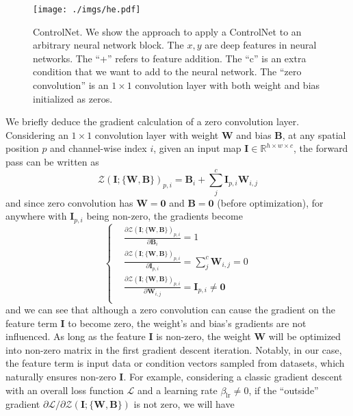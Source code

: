 \documentclass{article}
\begin{document}
\begin{figure}
	\centering
	\texttt{[image: ./imgs/he.pdf]}
	\caption{ControlNet. We show the approach to apply a ControlNet to an arbitrary neural network block. The $x, y$ are deep features in neural networks. The ``+'' refers to feature addition. The ``c'' is an extra condition that we want to add to the neural network. The ``zero convolution'' is an $1\times 1$ convolution layer with both weight and bias initialized as zeros.}
	\label{fig:he}
\end{figure}

We briefly deduce the gradient calculation of a zero convolution layer. Considering an $1\times 1$ convolution layer with weight $\bm{W}$ and bias $\bm{B}$, at any spatial position $p$ and channel-wise index $i$, given an input map $\bm{I}\in\mathbb{R}^{h\times w \times c}$, the forward pass can be written as 
\begin{equation}
	\mathcal{Z}(\bm{I};\{\bm{W},\bm{B}\})_{p,i}=\bm{B}_i + \sum_{j}^c \bm{I}_{p,i} \bm{W}_{i,j}
\end{equation}
and since zero convolution has $\bm{W}=\bm{0}$ and $\bm{B}=\bm{0}$ (before optimization), for anywhere with $\bm{I}_{p,i}$ being non-zero, the gradients become
\begin{equation}
	\left\{
	\begin{aligned}
		&\frac{\partial\mathcal{Z}(\bm{I};\{\bm{W},\bm{B}\})_{p,i}}{\partial\bm{B}_{i}} = 1 \\
		&\frac{\partial\mathcal{Z}(\bm{I};\{\bm{W},\bm{B}\})_{p,i}}{\partial\bm{I}_{p,i}} = \sum_{j}^c \bm{W}_{i,j} = 0 \\
		&\frac{\partial\mathcal{Z}(\bm{I};\{\bm{W},\bm{B}\})_{p,i}}{\partial\bm{W}_{i,j}} = \bm{I}_{p,i} \neq \bm{0} \\
	\end{aligned}
	\right.
\end{equation}
and we can see that although a zero convolution can cause the gradient on the feature term $\bm{I}$ to become zero, the weight's and bias's gradients are not influenced. As long as the feature $\bm{I}$ is non-zero, the weight $\bm{W}$ will be optimized into non-zero matrix in the first gradient descent iteration. Notably, in our case, the feature term is input data or condition vectors sampled from datasets, which naturally ensures non-zero $\bm{I}$. For example, considering a classic gradient descent with an overall loss function $\mathcal{L}$ and a learning rate $\beta_{\text{lr}}\neq 0$, if the ``outside'' gradient ${\partial\mathcal{L}}/{\partial\mathcal{Z}(\bm{I};\{\bm{W},\bm{B}\})}$ is not zero, we will have
\end{document}
